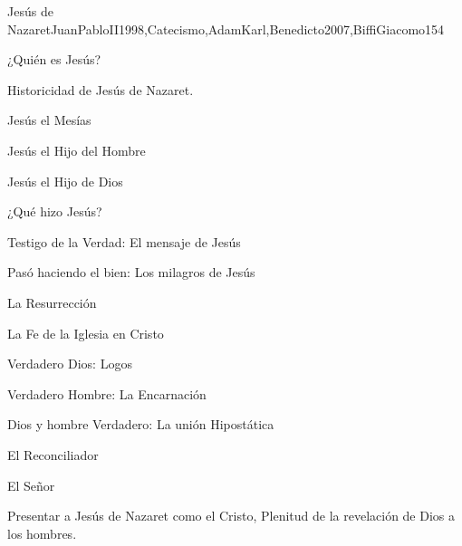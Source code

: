 \begin{syllabus}
\begin{unit}{Jesús de Nazaret}{JuanPabloII1998,Catecismo,AdamKarl,Benedicto2007,BiffiGiacomo}{15}{4}
\begin{topics}
      \item ¿Quién es Jesús?
      \begin{inparaenum}
      \item Historicidad de Jesús de Nazaret.
      \item Jesús el Mesías
      \item Jesús el Hijo del Hombre
      \item Jesús el Hijo de Dios
\end{inparaenum}
      \item ¿Qué hizo Jesús?
      \begin{inparaenum}
      \item Testigo de la Verdad: El mensaje de Jesús
      \item Pasó haciendo el bien: Los milagros de Jesús
      \item La Resurrección
\end{inparaenum}
      \item La Fe de la Iglesia en Cristo
      \begin{inparaenum}
      \item Verdadero Dios: Logos
      \item Verdadero Hombre: La Encarnación
      \item Dios y hombre Verdadero: La unión Hipostática
      \item El Reconciliador
      \item El Señor
	\end{inparaenum}

\end{topics}

\begin{unitgoals}
      \item Presentar a Jesús de Nazaret como el Cristo, Plenitud de la revelación de Dios a los hombres.
\end{unitgoals}
\end{unit}


\end{syllabus}
